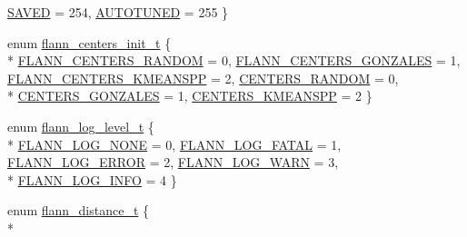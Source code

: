 \begin{DoxyCompactItemize}
\hyperlink{namespacecvflann_a4e3e6c98d774ea77fd7f0045c9bc7817af30380e5373fe44861951d356a1f43a4}{S\-A\-V\-E\-D} = 254, 
\hyperlink{namespacecvflann_a4e3e6c98d774ea77fd7f0045c9bc7817aef8622927b8a938976f6da27a7dcffdb}{A\-U\-T\-O\-T\-U\-N\-E\-D} = 255
 \}
\item 
enum \hyperlink{namespacecvflann_a0ad8b53e8b203599f13d67e54c197703}{flann\-\_\-centers\-\_\-init\-\_\-t} \{ \\*
\hyperlink{namespacecvflann_a0ad8b53e8b203599f13d67e54c197703a2cec6d6a56fac53c140b2f8f28a14aef}{F\-L\-A\-N\-N\-\_\-\-C\-E\-N\-T\-E\-R\-S\-\_\-\-R\-A\-N\-D\-O\-M} = 0, 
\hyperlink{namespacecvflann_a0ad8b53e8b203599f13d67e54c197703a8f42551d6005b25200e6e239d7e1f036}{F\-L\-A\-N\-N\-\_\-\-C\-E\-N\-T\-E\-R\-S\-\_\-\-G\-O\-N\-Z\-A\-L\-E\-S} = 1, 
\hyperlink{namespacecvflann_a0ad8b53e8b203599f13d67e54c197703a99f2e3471f856cda026b4d922275e60b}{F\-L\-A\-N\-N\-\_\-\-C\-E\-N\-T\-E\-R\-S\-\_\-\-K\-M\-E\-A\-N\-S\-P\-P} = 2, 
\hyperlink{namespacecvflann_a0ad8b53e8b203599f13d67e54c197703ab095d19f60989752478f9d4a44f84cb2}{C\-E\-N\-T\-E\-R\-S\-\_\-\-R\-A\-N\-D\-O\-M} = 0, 
\\*
\hyperlink{namespacecvflann_a0ad8b53e8b203599f13d67e54c197703a03b98d4ec57601a8cda560d2f834d8d5}{C\-E\-N\-T\-E\-R\-S\-\_\-\-G\-O\-N\-Z\-A\-L\-E\-S} = 1, 
\hyperlink{namespacecvflann_a0ad8b53e8b203599f13d67e54c197703a25ddb80fd5ab89de152c857954150b9f}{C\-E\-N\-T\-E\-R\-S\-\_\-\-K\-M\-E\-A\-N\-S\-P\-P} = 2
 \}
\item 
enum \hyperlink{namespacecvflann_a66d3d2cd0c117c07dafb83b179204ae5}{flann\-\_\-log\-\_\-level\-\_\-t} \{ \\*
\hyperlink{namespacecvflann_a66d3d2cd0c117c07dafb83b179204ae5a218555ba4e1fe1f97ea74a471153849f}{F\-L\-A\-N\-N\-\_\-\-L\-O\-G\-\_\-\-N\-O\-N\-E} = 0, 
\hyperlink{namespacecvflann_a66d3d2cd0c117c07dafb83b179204ae5a78f4a1b618756f0743caa9fd6a66018b}{F\-L\-A\-N\-N\-\_\-\-L\-O\-G\-\_\-\-F\-A\-T\-A\-L} = 1, 
\hyperlink{namespacecvflann_a66d3d2cd0c117c07dafb83b179204ae5aa890c4eb36804e6d91f5ea513810cbb6}{F\-L\-A\-N\-N\-\_\-\-L\-O\-G\-\_\-\-E\-R\-R\-O\-R} = 2, 
\hyperlink{namespacecvflann_a66d3d2cd0c117c07dafb83b179204ae5a4d2b1af39e949f15efa9a9da0e6c7866}{F\-L\-A\-N\-N\-\_\-\-L\-O\-G\-\_\-\-W\-A\-R\-N} = 3, 
\\*
\hyperlink{namespacecvflann_a66d3d2cd0c117c07dafb83b179204ae5a4155037f567c966e9cd5900678bd2e16}{F\-L\-A\-N\-N\-\_\-\-L\-O\-G\-\_\-\-I\-N\-F\-O} = 4
 \}
\item 
enum \hyperlink{namespacecvflann_aaf5ebd053bd32f6b924e6e59868a1ee1}{flann\-\_\-distance\-\_\-t} \{ \\*

\end{DoxyCompactItemize}
